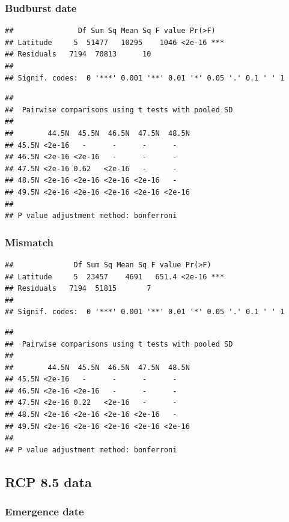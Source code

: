 \documentclass[12 pt]{article}
\begin{document}
\subsubsection*{Budburst date}

\begin{verbatim}
##               Df Sum Sq Mean Sq F value Pr(>F)    
## Latitude     5  51477   10295    1046 <2e-16 ***
## Residuals   7194  70813      10                   
## 
## Signif. codes:  0 '***' 0.001 '**' 0.01 '*' 0.05 '.' 0.1 ' ' 1
\end{verbatim}

\begin{verbatim}
## 
##  Pairwise comparisons using t tests with pooled SD 
## 
##        44.5N  45.5N  46.5N  47.5N  48.5N 
## 45.5N <2e-16   -      -      -      -     
## 46.5N <2e-16 <2e-16   -      -      -     
## 47.5N <2e-16 0.62   <2e-16   -      -     
## 48.5N <2e-16 <2e-16 <2e-16 <2e-16   -     
## 49.5N <2e-16 <2e-16 <2e-16 <2e-16 <2e-16
## 
## P value adjustment method: bonferroni
\end{verbatim}

\subsubsection*{Mismatch}

\begin{verbatim}
##              Df Sum Sq Mean Sq F value Pr(>F)    
## Latitude     5  23457    4691   651.4 <2e-16 ***
## Residuals   7194  51815       7                   
## 
## Signif. codes:  0 '***' 0.001 '**' 0.01 '*' 0.05 '.' 0.1 ' ' 1
\end{verbatim}

\begin{verbatim}
## 
##  Pairwise comparisons using t tests with pooled SD 
## 
##        44.5N  45.5N  46.5N  47.5N  48.5N 
## 45.5N <2e-16   -      -      -      -     
## 46.5N <2e-16 <2e-16   -      -      -     
## 47.5N <2e-16 0.22   <2e-16   -      -     
## 48.5N <2e-16 <2e-16 <2e-16 <2e-16   -     
## 49.5N <2e-16 <2e-16 <2e-16 <2e-16 <2e-16
## 
## P value adjustment method: bonferroni
\end{verbatim}

\subsection{RCP 8.5 data}
\subsubsection*{Emergence date}
\end{document}
